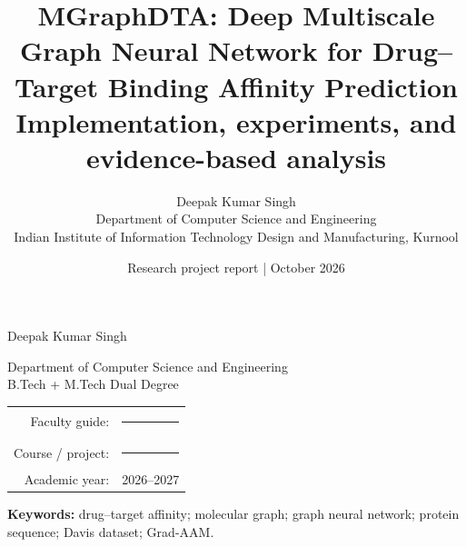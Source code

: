 \documentclass[10pt,a4paper]{article}
\title{\vspace{-1.5em}\textbf{MGraphDTA: Deep Multiscale Graph Neural Network for Drug--Target Binding Affinity Prediction}\\[5pt]\large Implementation, experiments, and evidence-based analysis}
\author{Deepak Kumar Singh\\\normalsize Department of Computer Science and Engineering\\\normalsize Indian Institute of Information Technology Design and Manufacturing, Kurnool}
\date{\normalsize Research project report \quad | \quad 27 October 2026}
\begin{document}
\begin{titlepage}\centering\vspace*{22mm}{\Large\bfseries INDIAN INSTITUTE OF INFORMATION TECHNOLOGY DESIGN AND MANUFACTURING, KURNOOL\par}\vspace{18mm}{\color{navy}\rule{\linewidth}{1.2pt}}\vspace{12mm}{\huge\bfseries MGraphDTA\par}\vspace{4mm}{\LARGE Deep Multiscale Graph Neural Network for\\Drug--Target Binding Affinity Prediction\par}\vspace{10mm}{\large Implementation, experiments, and evidence-based analysis\par}\vspace{18mm}{\color{navy}\rule{0.72\linewidth}{0.7pt}}\vfill{\Large Deepak Kumar Singh\par}\vspace{4mm}Department of Computer Science and Engineering\\B.Tech + M.Tech Dual Degree\vfill\begin{tabular}{rl}Faculty guide: & \rule{72mm}{0.4pt}\\[7pt]Course / project: & \rule{72mm}{0.4pt}\\[7pt]Academic year: & 2026--2027\end{tabular}\vspace{12mm}\end{titlepage}
\begin{abstract}\end{abstract}
\noindent\textbf{Keywords:} drug--target affinity; molecular graph; graph neural network; protein sequence; Davis dataset; Grad-AAM.
\tableofcontents
\clearpage{}




\end{document}
